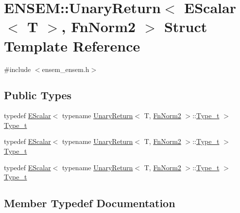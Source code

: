 \hypertarget{structENSEM_1_1UnaryReturn_3_01EScalar_3_01T_01_4_00_01FnNorm2_01_4}{}\section{E\+N\+S\+EM\+:\+:Unary\+Return$<$ E\+Scalar$<$ T $>$, Fn\+Norm2 $>$ Struct Template Reference}
\label{structENSEM_1_1UnaryReturn_3_01EScalar_3_01T_01_4_00_01FnNorm2_01_4}


{\ttfamily \#include $<$ensem\+\_\+ensem.\+h$>$}

\subsection*{Public Types}
\begin{DoxyCompactItemize}
\item 
typedef \mbox{\hyperlink{classENSEM_1_1EScalar}{E\+Scalar}}$<$ typename \mbox{\hyperlink{structENSEM_1_1UnaryReturn}{Unary\+Return}}$<$ T, \mbox{\hyperlink{structENSEM_1_1FnNorm2}{Fn\+Norm2}} $>$\+::\mbox{\hyperlink{structENSEM_1_1UnaryReturn_3_01EScalar_3_01T_01_4_00_01FnNorm2_01_4_acb54ade58c6e4e3f443f349d5ddb92e1}{Type\+\_\+t}} $>$ \mbox{\hyperlink{structENSEM_1_1UnaryReturn_3_01EScalar_3_01T_01_4_00_01FnNorm2_01_4_acb54ade58c6e4e3f443f349d5ddb92e1}{Type\+\_\+t}}
\item 
typedef \mbox{\hyperlink{classENSEM_1_1EScalar}{E\+Scalar}}$<$ typename \mbox{\hyperlink{structENSEM_1_1UnaryReturn}{Unary\+Return}}$<$ T, \mbox{\hyperlink{structENSEM_1_1FnNorm2}{Fn\+Norm2}} $>$\+::\mbox{\hyperlink{structENSEM_1_1UnaryReturn_3_01EScalar_3_01T_01_4_00_01FnNorm2_01_4_acb54ade58c6e4e3f443f349d5ddb92e1}{Type\+\_\+t}} $>$ \mbox{\hyperlink{structENSEM_1_1UnaryReturn_3_01EScalar_3_01T_01_4_00_01FnNorm2_01_4_acb54ade58c6e4e3f443f349d5ddb92e1}{Type\+\_\+t}}
\item 
typedef \mbox{\hyperlink{classENSEM_1_1EScalar}{E\+Scalar}}$<$ typename \mbox{\hyperlink{structENSEM_1_1UnaryReturn}{Unary\+Return}}$<$ T, \mbox{\hyperlink{structENSEM_1_1FnNorm2}{Fn\+Norm2}} $>$\+::\mbox{\hyperlink{structENSEM_1_1UnaryReturn_3_01EScalar_3_01T_01_4_00_01FnNorm2_01_4_acb54ade58c6e4e3f443f349d5ddb92e1}{Type\+\_\+t}} $>$ \mbox{\hyperlink{structENSEM_1_1UnaryReturn_3_01EScalar_3_01T_01_4_00_01FnNorm2_01_4_acb54ade58c6e4e3f443f349d5ddb92e1}{Type\+\_\+t}}
\end{DoxyCompactItemize}


\subsection{Member Typedef Documentation}
\mbox{\label{structENSEM_1_1UnaryReturn_3_01EScalar_3_01T_01_4_00_01FnNorm2_01_4_acb54ade58c6e4e3f443f349d5ddb92e1}} 
